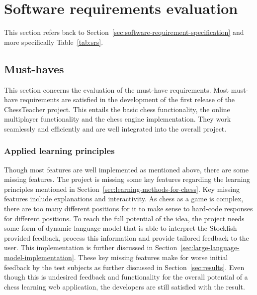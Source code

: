 \section{Software requirements evaluation}\label{sec:software-requirements-evaluation}

This section refers back to Section~\ref{sec:software-requirement-specification} and more specifically
Table~\ref{tab:srs}.


\subsection{Must-haves}\label{subsec:must-haves}

This section concerns the evaluation of the must-have requirements.
Most must-have requirements are satisfied in the development of the first release of the ChessTeacher project.
This entails the basic chess functionality, the online multiplayer functionality and the chess engine implementation.
They work seamlessly and efficiently and are well integrated into the overall project.


\subsubsection{Applied learning principles}

Though most features are well implemented as mentioned above, there are some missing features.
The project is missing some key features regarding the learning principles mentioned in
Section~\ref{sec:learning-methods-for-chess}.
Key missing features include explanations and interactivity.
As chess as a game is complex, there are too many different positions for it to make sense to hard-code responses for
different positions.
To reach the full potential of the idea, the project needs some form of dynamic language model that is able to interpret
the Stockfish provided feedback, process this information and provide tailored feedback to the user.
This implementation is further discussed in Section~\ref{sec:large-language-model-implementation}.
These key missing features make for worse initial feedback by the test subjects as further discussed in
Section~\ref{sec:results}.
Even though this is undesired feedback and functionality for the overall potential of a chess learning web
application, the developers are still satisfied with the result.

